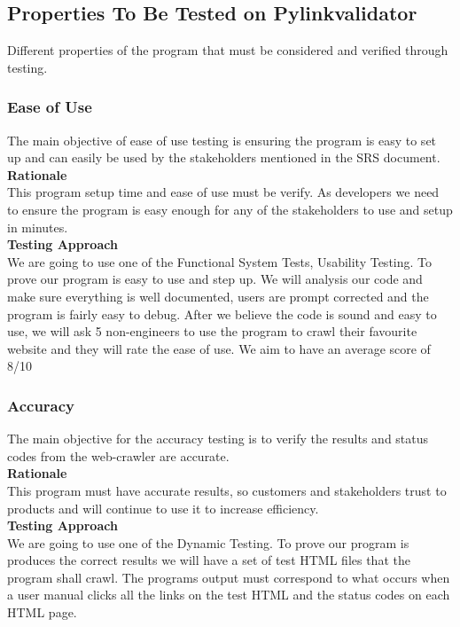 \documentclass[12pt, titlepage]{article}
\begin{document}
\subsection{Properties To Be Tested on Pylinkvalidator}
Different properties of the program that must be considered and verified through testing.\\
\subsubsection{Ease of Use}
The main objective of ease of use testing is ensuring the program is easy to set up and can easily be used by the stakeholders mentioned in the SRS document.\\

\textbf{Rationale}  \\

This program setup time and ease of use must be verify. As developers we need to ensure the program is easy enough for any of the stakeholders to use and setup in minutes.\\

\textbf{Testing Approach} \\ 

 We are going to use one of the  Functional System Tests, Usability Testing. To prove our program is easy to use and step up. We will analysis our code and make sure everything is well documented, users are prompt corrected and the program is fairly easy to debug. After we believe the code is sound and easy to use, we will ask 5 non-engineers to use the program to crawl their favourite website and they will rate the ease of use. We aim to have an average score of 8/10

\subsubsection{Accuracy}
The main objective for the accuracy testing is to verify the results and status codes from the web-crawler are accurate.\\

\textbf{Rationale}  \\

This program must have accurate results, so customers and stakeholders trust to products and will continue to use it to increase efficiency.\\

\textbf{Testing Approach} \\ 

 We are going to use one of the  Dynamic Testing. To prove our program is produces the correct results we will have a set of test HTML files that the  program shall crawl. The programs output must correspond to what occurs when a user manual clicks all the links on the test HTML and the status codes on each HTML page.
\end{document}
